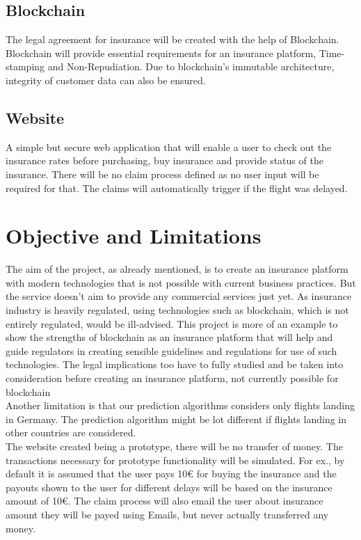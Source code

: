    \subsection{Blockchain}
    The legal agreement for insurance will be created with the help of Blockchain. Blockchain will provide essential requirements for an insurance platform, Time-stamping and Non-Repudiation. Due to blockchain's immutable architecture, integrity of customer data can also be ensured.
    \subsection{Website}
    A simple but secure web application that will enable a user to check out the insurance rates before purchasing, buy insurance and provide status of the insurance. There will be no claim process defined as no user input will be required for that. The claims will automatically trigger if the flight was delayed.

\section{Objective and Limitations}
The aim of the project, as already mentioned, is to create an insurance platform with modern technologies that is not possible with current business practices. But the service doesn't aim to provide any commercial services just yet. As insurance industry is heavily regulated, using technologies such as blockchain, which is not entirely regulated, would be ill-advised. This project is more of an example to show the strengths of blockchain as an insurance platform that will help and guide regulators in creating sensible guidelines and regulations for use of such technologies. The legal implications too have to fully studied and be taken into consideration before creating an insurance platform, not currently possible for blockchain
\\Another limitation is that our prediction algorithms considers only flights landing in Germany. The prediction algorithm might be lot different if flights landing in other countries are considered.
\\The website created being a prototype, there will be no transfer of money. The transactions necessary for prototype functionality will be simulated. For ex., by default it is assumed that the user pays 10€ for buying the insurance and the payouts shown to the user for different delays will be based on the insurance amount of 10€. The claim process will also email the user about insurance amount they will be payed using Emails, but never actually transferred any money.